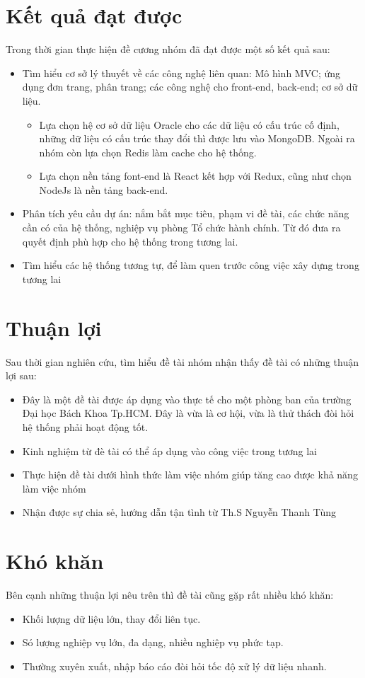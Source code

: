\section{Kết quả đạt được}
Trong thời gian thực hiện đề cương nhóm đã đạt được một số kết quả sau:
\begin{itemize}
    \item Tìm hiểu cơ sở lý thuyết về các công nghệ liên quan: Mô hình MVC; ứng dụng đơn trang, phân trang; các công nghệ cho front-end, back-end; cơ sở dữ liệu.
    \begin{itemize}
        \item Lựa chọn hệ cơ sở dữ liệu Oracle cho các dữ liệu có cấu trúc cố định, những dữ liệu có cấu trúc thay đổi thì được lưu vào MongoDB. Ngoài ra nhóm còn lựa chọn Redis làm cache cho hệ thống.
        \item Lựa chọn nền tảng font-end là React kết hợp với Redux, cũng như chọn NodeJs là nền tảng back-end.
    \end{itemize}
    \item Phân tích yêu cầu dự án: nắm bắt mục tiêu, phạm vi đề tài, các chức năng cần có của hệ thống, nghiệp vụ phòng Tổ chức hành chính. Từ đó đưa ra quyết định phù hợp cho hệ thống trong tương lai.
    \item Tìm hiểu các hệ thống tương tự, để làm quen trước công việc xây dựng trong tương lai
\end{itemize}
\section{Thuận lợi}
Sau thời gian nghiên cứu, tìm hiểu đề tài nhóm nhận thấy đề tài có những thuận lợi sau:
\begin{itemize}
    \item Đây là một đề tài được áp dụng vào thực tế cho một phòng ban của trường Đại học Bách Khoa Tp.HCM. Đây là vừa là cơ hội, vừa là thử thách đòi hỏi hệ thống phải hoạt động tốt.
    \item Kinh nghiệm từ đè tài có thể áp dụng vào công việc trong tương lai
    \item Thực hiện đề tài dưới hình thức làm việc nhóm giúp tăng cao được khả năng làm việc nhóm
    \item Nhận được sự chia sẻ, hướng dẫn tận tình từ Th.S Nguyễn Thanh Tùng
\end{itemize}
\section{Khó khăn}
Bên cạnh những thuận lợi nêu trên thì đề tài cũng gặp rất nhiều khó khăn:
\begin{itemize}
    \item Khối lượng dữ liệu lớn, thay đổi liên tục.
    \item Só lượng nghiệp vụ lớn, đa dạng, nhiều nghiệp vụ phức tạp.
    \item Thường xuyên xuất, nhập báo cáo đòi hỏi tốc độ xử lý dữ liệu nhanh.
\end{itemize}
